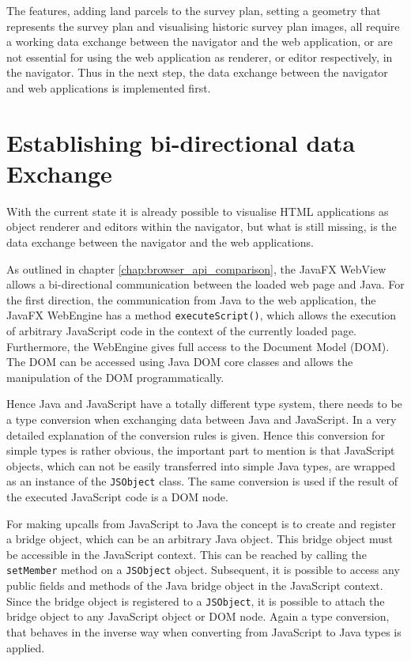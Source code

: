 The features, adding land parcels to the survey plan, setting a geometry that represents the survey plan and visualising historic survey plan images, all require a working data exchange between the navigator and the web application, or are not essential for using the web application as renderer, or editor respectively, in the navigator. 
Thus in the next step, the data exchange between the navigator and web applications is implemented first.

\section{Establishing bi-directional data Exchange}


With the current state it is already possible to visualise HTML applications as object renderer and editors within the navigator, but what is still missing, is the data exchange between the navigator and the web applications.
 
As outlined in chapter \ref{chap:browser_api_comparison}, the JavaFX WebView allows a bi-directional communication between the loaded web page and Java.
For the first direction, the communication from Java to the web application, the JavaFX WebEngine has a method \texttt{executeScript()}, which allows the execution of arbitrary JavaScript code in the  context of the currently loaded page.
Furthermore, the WebEngine gives full access to the Document Model (DOM).
The DOM can be accessed using Java DOM core classes and allows the manipulation of the DOM programmatically.
 
Hence Java and JavaScript have a totally different type system, there needs to be a type conversion when exchanging data between Java and JavaScript.
In \autocite{impl:java2js-data-conversion}  a very detailed explanation of the conversion rules is given.
Hence this conversion for simple types is rather obvious, the important part to mention is that JavaScript objects, which can not be easily transferred into simple Java types, are wrapped as an instance of the \texttt{JSObject} class.
The same conversion is used if the result of the executed JavaScript code is a DOM node.

For making upcalls from JavaScript to Java the concept is to create and register a bridge object, which can be an arbitrary Java object.
This bridge object must be accessible in the JavaScript context. 
This can be reached by calling the \texttt{setMember} method on a \texttt{JSObject} object.
Subsequent, it is possible to access any public fields and methods of the Java bridge object in the JavaScript context.
Since the bridge object is registered to a \texttt{JSObject}, it is possible to attach the bridge object to any JavaScript object or DOM node.
Again a type conversion, that behaves in the inverse way when converting from JavaScript to Java types is applied.

